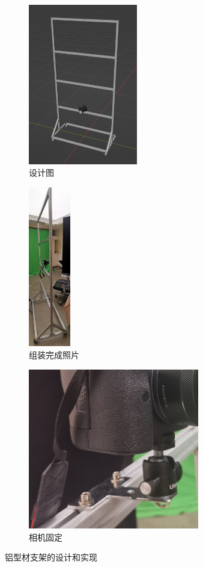 \begin{figure}
\centering
\begin{subfigure}[b]{0.3\textwidth}
    \centering
    \includegraphics[height=7cm]{figures/frame-design}
    \caption{设计图}
\end{subfigure}
\begin{subfigure}[b]{0.2\textwidth}
    \centering
    \includegraphics[height=7cm]{figures/frame-impl}
    \caption{组装完成照片}
\end{subfigure}
\begin{subfigure}[b]{0.47\textwidth}
    \centering
    \includegraphics[height=7cm]{figures/frame-camera}
    \caption{相机固定}
\end{subfigure}
\caption{铝型材支架的设计和实现}
\label{fig:frame}
\end{figure}

